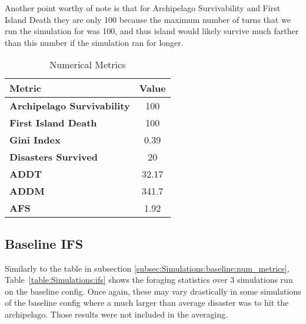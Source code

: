 Another point worthy of note is that for Archipelago Survivability and First Island Death they are only 100 because the maximum number of turns that we run the simulation for was 100, and thus island would likely survive much farther than this number if the simulation ran for longer.
\begin{table}[htb]
    \centering
    \begin{tabular}{|l|c|}
    \hline
    \textbf{Metric}                     & \textbf{Value} \\ \hline
    \textbf{Archipelago Survivability}  & 100     \\
    \textbf{First Island Death}         & 100     \\
    \textbf{Gini Index}                 & 0.39    \\
    \textbf{Disasters Survived}         & 20     \\
    \textbf{ADDT}                       & 32.17     \\
    \textbf{ADDM}                       & 341.7     \\
    \textbf{AFS}                        & 1.92     \\ \hline
\end{tabular}
\caption{Numerical Metrics}
\label{table:Simulations:num_metric}
\end{table}

\subsection{Baseline IFS}
\label{subsec:Simulations:baseline:ifs}

Similarly to the table in subsection \ref{subsec:Simulations:baseline:num_metrics}, Table~\ref{table:Simulations:ifs} shows the foraging statistics over 3 simulations run on the baseline config. Once again, these may vary drastically in some simulations of the baseline config where a much larger than average disaster was to hit the archipelago. Those results were not included in the averaging.

